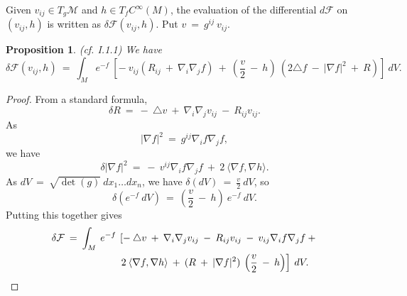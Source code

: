 \documentclass[12pt]{amsart}
\numberwithin{equation}{section}
\theoremstyle{plain}
\newtheorem{proposition}[equation]{Proposition}
\theoremstyle{definition}
\theoremstyle{remark}
\begin{document}
Given $v_{ij} \in T_g{\mathcal M}$ and $h \in T_f C^\infty(M)$, the
evaluation of the differential $d{\mathcal F}$ on $(v_{ij}, h)$ is
written as $\delta {\mathcal F}(v_{ij}, h)$.
Put $v \: = \: g^{ij} \: v_{ij}$.
\begin{proposition} (cf. I.1.1)
We have 
\begin{equation}
\delta {\mathcal F}(v_{ij}, h) \: = \:
\int_M e^{-f} \: \left[ - \: v_{ij} 
(R_{ij} \: + \: \nabla_i \nabla_j f) \: + \: 
\left( \frac{v}{2} \: - \: h \right) \: (2 \triangle f \: - \:
|\nabla f|^2 \: + \: R) \right] \: dV.
\end{equation}
\end{proposition}
\begin{proof}
From a standard formula,
\begin{equation}
\delta R \: = \: - \: \triangle v \: + \: \nabla_i \nabla_j v_{ij}
\: - \: R_{ij} v_{ij}.
\end{equation}
As 
\begin{equation}
|\nabla f|^2 \: = \: g^{ij} \nabla_i f \nabla_j f,
\end{equation}
we have
\begin{equation}
\delta |\nabla f|^2 \: = \: - \: v^{ij} \nabla_i f \nabla_j f
\: + \: 2 \: \langle \nabla f, \nabla h \rangle.
\end{equation}
As $dV \: = \: \sqrt{\det(g)} \: dx_1 \ldots dx_n$, we have
$\delta (dV) \: = \: \frac{v}{2} \: dV$, so
\begin{equation} \label{measvar}
\delta \left( e^{-f} \: dV \right) \: = \: \left( \frac{v}{2} \: - \: h
\right) \: e^{-f} \: dV.
\end{equation}
Putting this together gives
\begin{align} \label{putting}
\delta {\mathcal F} \: = \: 
\int_M \:  e^{-f} \: & \left[  - \: \triangle v \: + \:
\nabla_i \nabla_j v_{ij} \: - \: R_{ij} v_{ij} \: - \:
v_{ij} \nabla_i f \nabla_j f \: + \right. \\
& \left.  2 \: \langle \nabla f, \nabla h \rangle
\: + \: (R \: + \: |\nabla f|^2 ) \: \left( \frac{v}{2} \: - \: h \right)
\right] \:  dV. \notag
\end{align}


\end{proof}
\end{document}
